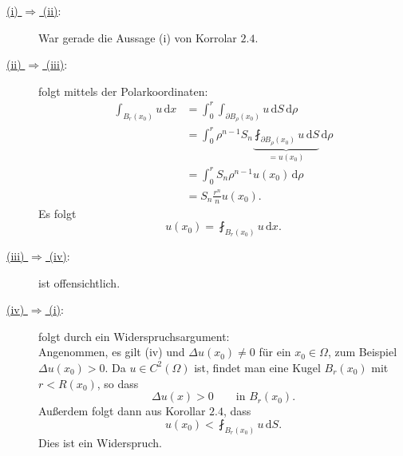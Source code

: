 \begin{beweis}
	\begin{description}
		\item[\underline{(i) $\Rightarrow$ (ii)}:] War gerade die Aussage (i) von Korrolar $2.4$.
		\item[\underline{(ii) $\Rightarrow$ (iii)}:] folgt mittels der Polarkoordinaten:
		\begin{align*}
			\int_{B_r(x_0)}^{}u \,\mathrm{d}x &= \int_{0}^{r} \int_{\partial B_\rho(x_0)}^{} u \,\mathrm{d}S \,\mathrm{d}\rho  \\
			&= \int_{0}^{r} \rho^{n-1}S_n \underset{=u(x_0)}{\underbrace{\fint_{\partial B_{\rho}(x_0)}^{} u \,\mathrm{d}S}} \,\mathrm{d} \rho \\
			&= \int_{0}^{r}S_n \rho^{n-1} u(x_0)\,\mathrm{d}\rho \\
			&= S_n \frac{r^n}{n} u(x_0).
		\end{align*}
		Es folgt \[
			u(x_0) = \fint_{B_r(x_0)}^{} u \,\mathrm{d}x.
		\]
		\item[\underline{(iii) $\Rightarrow$ (iv)}:] ist offensichtlich.
		\item[\underline{(iv) $\Rightarrow$ (i)}:] folgt durch ein Widerspruchsargument: \\
		Angenommen, es gilt (iv) und $\Delta u(x_0) \neq 0$ für ein $x_0 \in \Omega$, zum Beispiel $ \Delta u(x_0) > 0$. 
		Da $u \in C^2(\Omega)$ ist, findet man eine Kugel $B_r(x_0)$ mit $r < R(x_0)$, so dass
		\[
			\Delta u(x) > 0 \qquad \text{in } B_r(x_0).
		\]
		Außerdem folgt dann aus Korollar $2.4$, dass 
		\[
			u(x_0)< \fint_{B_r(x_0)}^{} u \,\mathrm{d}S.
		\]
		Dies ist ein Widerspruch.
	\end{description}
\end{beweis}


